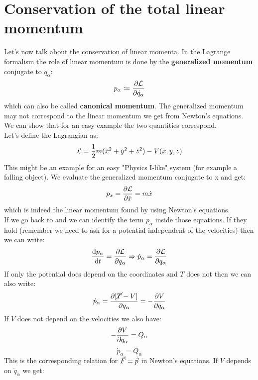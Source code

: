 \section{Conservation of the total linear momentum}
Let's now talk about the conservation of linear momenta. In the Lagrange formalism the role of linear momentum is done by the \textbf{generalized momentum} conjugate to $q_{\alpha}$:
\begin{equation}
    p_{\alpha} \defineeq \pdv{\lagr}{\dot{q}_{\alpha}}
\end{equation}
which can also be called \textbf{canonical momentum}. The generalized momentum may not correspond to the linear momentum we get from Newton's equations. We can show that for an easy example the two quantities correspond.\\
Let's define the Lagrangian as:
\begin{equation}
    \mathcal{L} = \dfrac{1}{2}m(\dot{x}^2 + \dot{y}^2 + \dot{z}^2) - V(x,y,z)
\end{equation}
This might be an example for an easy "Physics I-like" system (for example a falling object). We evaluate the generalized momentum conjugate to x and get:
\begin{equation}
    p_x = \dfrac{\partial \mathcal{L}}{\partial \dot{x}} = m\dot{x}
\end{equation}
which is indeed the linear momentum found by using Newton's equations.\\
If we go back to \eleref\;and \lagrangeref\;we can identify the term $p_{\alpha}$ inside those equations. If they hold (remember we need to ask for a potential independent of the velocities) then we can write:
\begin{equation}
    \dfrac{\dd{p_{\alpha}}}{\dd{t}} = \pdv{\lagr}{q_{\alpha}} \Rightarrow \dot{p}_{\alpha} = \pdv{\lagr}{q_{\alpha}}
\end{equation}
If only the potential does depend on the coordinates and $T$ does not then we can also write:
\begin{equation}
    \dot{p}_{\alpha} = \pdv{[\cancel{T}-V]}{q_{\alpha}} = -\pdv{V}{q_{\alpha}}
\end{equation}
If $V$ does not depend on the velocities we also have:
\begin{equation}
    -\pdv{V}{q_{\alpha}} = Q_{\alpha}
\end{equation}
\begin{equation}
    \boxed{\dot{p}_{\alpha} = Q_{\alpha}}
\end{equation}
This is the corresponding relation for $\vec{F} = \dot{\vec{p}}$ in Newton's equations. If $V$ depends on $\dot{q}_{\alpha}$ we get:
